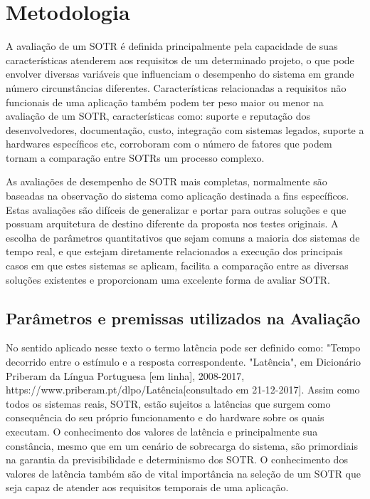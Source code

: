 \chapter{Metodologia}
\label{cap:projeto}

A avaliação de um SOTR é definida principalmente pela capacidade de suas características atenderem aos requisitos de um determinado projeto, o que pode envolver diversas variáveis que influenciam o desempenho do sistema em grande número circunstâncias diferentes. Características relacionadas a requisitos não funcionais de uma aplicação também  podem ter peso maior ou menor na avaliação de um SOTR, características como: suporte e reputação dos desenvolvedores, documentação, custo, integração com sistemas legados, suporte a hardwares específicos etc, corroboram com o número de fatores que podem tornam a comparação entre SOTRs um processo complexo.

As avaliações de desempenho de SOTR  mais completas, normalmente são baseadas na observação do sistema como aplicação destinada a fins específicos. Estas avaliações são difíceis de generalizar e portar para outras soluções e que possuam arquitetura de destino diferente da proposta nos testes originais. A escolha de parâmetros quantitativos que sejam comuns a maioria dos sistemas de tempo real, e que estejam diretamente relacionados a execução dos principais casos em que estes sistemas se aplicam, facilita a comparação entre as diversas soluções existentes e proporcionam uma excelente forma de avaliar SOTR.

\section{Parâmetros e premissas utilizados na Avaliação}

No sentido aplicado nesse texto o termo latência pode ser definido como: "Tempo decorrido entre o estímulo e a resposta correspondente. "Latência", em Dicionário Priberam da Língua Portuguesa [em linha], 2008-2017, https://www.priberam.pt/dlpo/Latência[consultado em 21-12-2017]. Assim como todos os sistemas reais, SOTR, estão sujeitos a latências que surgem como consequência do seu próprio funcionamento e do hardware sobre os quais executam. O conhecimento dos valores de latência e principalmente sua constância, mesmo que em um cenário de sobrecarga do sistema, são primordiais na garantia da previsibilidade e determinismo dos SOTR. O conhecimento dos valores de latência também são de vital importância na seleção de um SOTR que seja capaz de atender aos requisitos temporais de uma aplicação. 


